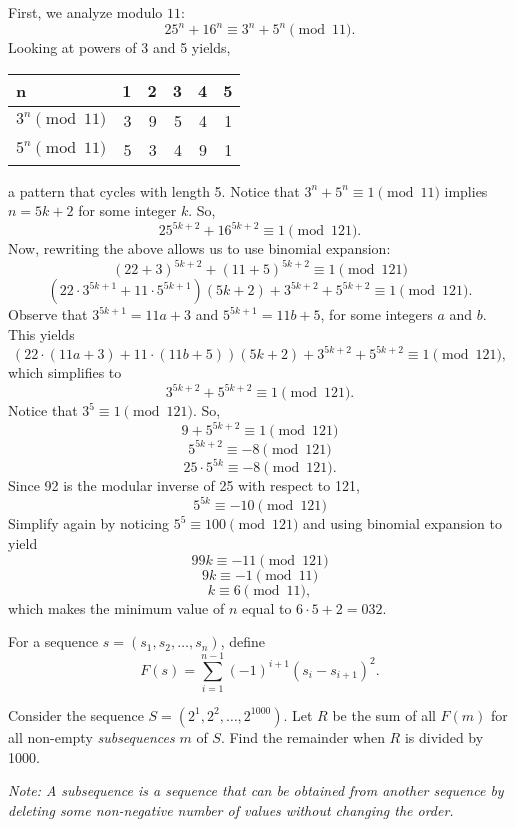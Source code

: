 \documentclass[11pt]{scrartcl}
\begin{document}
First, we analyze modulo $11$:
\[25^{n} + 16^{n} \equiv 3^{n} + 5^{n} \pmod{11}.\]
Looking at powers of 3 and 5 yields,
\begin{center}
    \begin{tabular}{l | r r r r r}
        n & 1 & 2 & 3 & 4 & 5 \\
        \hline
        $3^{n} \pmod{11}$ & 3 & 9 & 5 & 4 & 1 \\
        $5^{n} \pmod{11}$ & 5 & 3 & 4 & 9 & 1 \\
    \end{tabular}
\end{center}    
a pattern that cycles with length 5. Notice that $3^{n} + 5^{n} \equiv 1 \pmod{11}$ implies $n = 5k + 2$ for some integer $k$. So,
\[25^{5k + 2} + 16^{5k + 2} \equiv 1 \pmod{121}.\]
Now, rewriting the above allows us to use binomial expansion:
\[(22 + 3)^{5k + 2} + (11 + 5)^{5k + 2} \equiv 1 \pmod{121}\]
\[(22 \cdot 3^{5k + 1} + 11 \cdot 5^{5k + 1})(5k + 2) + 3^{5k + 2} + 5^{5k + 2} \equiv 1 \pmod{121}.\]
Observe that $3^{5k + 1} = 11a + 3$ and $5^{5k + 1} = 11b + 5$, for some integers $a$ and $b$. This yields
\[(22 \cdot (11a + 3) + 11 \cdot (11b + 5))(5k + 2) + 3^{5k + 2} + 5^{5k + 2} \equiv 1 \pmod{121},\]
which simplifies to
\[3^{5k + 2} + 5^{5k + 2} \equiv 1 \pmod{121}.\]
Notice that $3^{5} \equiv 1 \pmod{121}$. So,
\[9 + 5^{5k + 2} \equiv 1 \pmod{121}\]
\[5^{5k + 2} \equiv -8 \pmod{121}\]
\[25 \cdot 5^{5k} \equiv -8 \pmod{121}.\]
Since 92 is the modular inverse of 25 with respect to 121,
\[5^{5k} \equiv -10 \pmod{121}\]
Simplify again by noticing $5^{5} \equiv 100 \pmod{121}$ and using binomial expansion to yield
\[99k \equiv -11 \pmod{121}\]
\[9k \equiv -1 \pmod{11}\]
\[k \equiv 6 \pmod{11},\]
which makes the minimum value of $n$ equal to $6 \cdot 5 + 2 = \boxed{032}$.

\pagebreak

\begin{problem}
    For a sequence $s = (s_{1}, s_{2}, \dots, s_{n})$, define
    \[F(s) = \sum_{i = 1}^{n - 1} (-1)^{i + 1}(s_{i} - s_{i + 1})^{2}.\]

    Consider the sequence $S = (2^{1}, 2^{2}, \dots, 2^{1000})$. Let $R$ be the sum of all 
    $F(m)$ for all non-empty \emph{subsequences} $m$ of $S$. Find the remainder when $R$ is divided by 1000.

    \emph{Note: A subsequence is a sequence that can be obtained from another sequence by deleting some non-negative number of values without changing the order.}
\end{problem}
\end{document}
